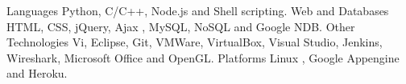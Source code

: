 \begin{cventries}
  \cventry
    {Languages}
    {}
    {}
    {}
    {\hspace{1.5em} Python, C/C++, Node.js and Shell scripting.}
   \cventry
    {Web and Databases}
    {}
    {}
    {}
    {\hspace{1.5em} HTML, CSS, jQuery, Ajax , MySQL, NoSQL and Google NDB.}
  \cventry
    {Other Technologies}
    {}
    {}
    {}
    {\hspace{1.5em} Vi, Eclipse, Git, VMWare, VirtualBox, Visual Studio, Jenkins, Wireshark, Microsoft Office and OpenGL.}
\cventry
    {Platforms}
    {}
    {}
    {}
    {\hspace{1.5em} Linux , Google Appengine and Heroku.}
\end{cventries}
